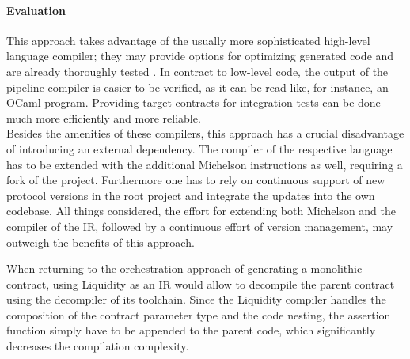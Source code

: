 \paragraph{Evaluation}
This approach takes advantage of the usually more sophisticated high-level language compiler; they may provide options for optimizing generated code and are already thoroughly tested \cite{liq_repo}\cite{ligo_repo}. In contract to low-level code, the output of the pipeline compiler is easier to be verified, as it can be read like, for instance, an OCaml program. Providing target contracts for integration tests can be done much more efficiently and more reliable. \\
Besides the amenities of these compilers, this approach has a crucial disadvantage of introducing an external dependency. The compiler of the respective language has to be extended with the additional Michelson instructions as well, requiring a fork of the project. Furthermore one has to rely on continuous support of new protocol versions in the root project and integrate the updates into the own codebase. All things considered, the effort for extending both Michelson and the compiler of the IR, followed by a continuous effort of version management, may outweigh the benefits of this approach.

When returning to the orchestration approach of generating a monolithic contract, using Liquidity as an IR would allow to decompile the parent contract using the decompiler of its toolchain. Since the Liquidity compiler handles the composition of the contract parameter type and the code nesting, the assertion function simply have to be appended to the parent code, which significantly decreases the compilation complexity.

